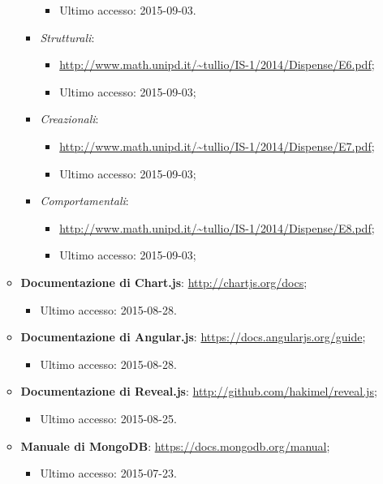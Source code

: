 \begin{itemize}
\begin{itemize}
\begin{itemize}
\begin{itemize}
								\item Ultimo accesso: 2015-09-03.
							\end{itemize}
						\item \textit{Strutturali}:
						\begin{itemize}
						\item \url{http://www.math.unipd.it/~tullio/IS-1/2014/Dispense/E6.pdf};
						\item Ultimo accesso: 2015-09-03;
						\end{itemize}
						\item \textit{Creazionali}:
						\begin{itemize}
						\item \url{http://www.math.unipd.it/~tullio/IS-1/2014/Dispense/E7.pdf};
						\item Ultimo accesso: 2015-09-03;
						\end{itemize}
						\item \textit{Comportamentali}:
						\begin{itemize}
						\item \url{http://www.math.unipd.it/~tullio/IS-1/2014/Dispense/E8.pdf};
						\item Ultimo accesso: 2015-09-03;
						\end{itemize}
					\end{itemize}
					\item \textbf{Documentazione di \gls{Chart.js}}: \url{http://chartjs.org/docs};
					\begin{itemize}
						\item Ultimo accesso: 2015-08-28.
					\end{itemize}
					\item \textbf{Documentazione di \gls{Angular}.js}: \url{https://docs.angularjs.org/guide};
					\begin{itemize}
						\item Ultimo accesso: 2015-08-28.
					\end{itemize}
					\item \textbf{Documentazione di \gls{Reveal.js}}: \url{http://github.com/hakimel/reveal.js};
					\begin{itemize}
						\item Ultimo accesso: 2015-08-25.
					\end{itemize}
					\item \textbf{Manuale di \gls{MongoDB}}: \url{https://docs.mongodb.org/manual};
					\begin{itemize}
						\item Ultimo accesso: 2015-07-23.

\end{itemize}
\end{itemize}
\end{itemize}
